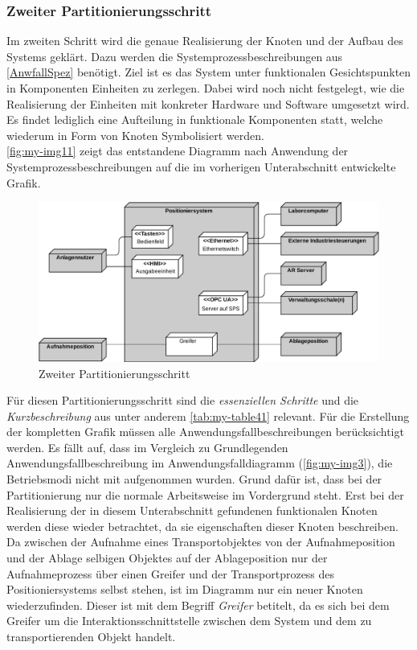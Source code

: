 \documentclass[../Bachelorarbeit.tex]{subfiles}
\begin{document}
\subsubsection{Zweiter Partitionierungsschritt}
Im zweiten Schritt wird die genaue Realisierung der Knoten und der Aufbau des Systems geklärt. Dazu werden die Systemprozessbeschreibungen aus \autoref{AnwfallSpez} benötigt. Ziel ist es das System unter funktionalen Gesichtspunkten in Komponenten \bzw Einheiten zu zerlegen. Dabei wird noch nicht festgelegt, wie die Realisierung der Einheiten mit konkreter Hardware und Software umgesetzt wird. Es findet lediglich eine Aufteilung in funktionale Komponenten statt, welche wiederum in Form von Knoten Symbolisiert werden. \\
\autoref{fig:my-img11} zeigt das entstandene Diagramm nach Anwendung der Systemprozessbeschreibungen auf die im vorherigen Unterabschnitt entwickelte Grafik. 

\begin{figure}[H]
    \centering
    \includegraphics[width=\textwidth]{Images/zweiter_schritt.pdf}
    \caption[Zweiter Partitionierungsschritt]{Zweiter Partitionierungsschritt}
    \label{fig:my-img11}
\end{figure}

Für diesen Partitionierungsschritt sind die \textit{essenziellen Schritte} und die \textit{Kurzbeschreibung} aus unter anderem \autoref{tab:my-table41} relevant. Für die Erstellung der kompletten Grafik müssen alle Anwendungsfallbeschreibungen berücksichtigt werden. Es fällt auf, dass im Vergleich zu Grundlegenden Anwendungsfallbeschreibung im Anwendungsfalldiagramm (\autoref{fig:my-img3}), die Betriebsmodi nicht mit aufgenommen wurden. Grund dafür ist, dass bei der Partitionierung nur die normale Arbeitsweise im Vordergrund steht. Erst bei der Realisierung der in diesem Unterabschnitt gefundenen funktionalen Knoten werden diese wieder betrachtet, da sie eigenschaften dieser Knoten beschreiben.\\
Da zwischen der Aufnahme eines Transportobjektes von der Aufnahmeposition und der Ablage selbigen Objektes auf der Ablageposition nur der Aufnahmeprozess über einen Greifer und der Transportprozess des Positioniersystems selbst stehen, ist im Diagramm nur ein neuer Knoten wiederzufinden. Dieser ist mit dem Begriff \textit{Greifer} betitelt, da es sich bei dem Greifer um die Interaktionsschnittstelle zwischen dem System und dem zu transportierenden Objekt handelt.
\end{document}
